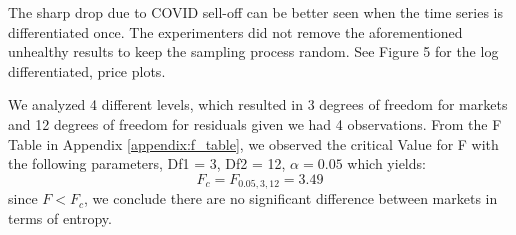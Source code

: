 \documentclass{article}[12pt]
\begin{document}
                    The sharp drop due to COVID sell-off can be better seen when the time series is differentiated once. The experimenters did not remove the aforementioned unhealthy results to keep the sampling process random. See Figure 5 for the log differentiated,  price plots.

                    \begin{figure}[htbp]
                        \centering
                        \hfill
                        \caption{}
                      \end{figure}

                  We analyzed 4 different levels, which resulted in 3 degrees of freedom for markets and 12 degrees of freedom for residuals given we had 4 observations. From the F Table in Appendix \ref{appendix:f_table}, we observed the critical Value for F with the following parameters, Df1 = 3, Df2 = 12, $\alpha = 0.05$ which yields: 
                  \[F_{c} = F_{0.05,3,12} = 3.49 \]
                    since \(F < F_c \), we conclude there are no significant difference between markets in terms of entropy. 
\end{document}
